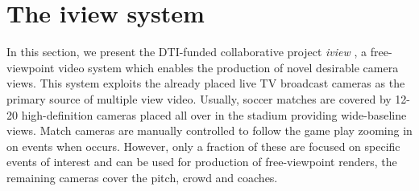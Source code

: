 
\section{The iview system}
In this section, we present the DTI-funded collaborative project \textit{iview} \cite{iview_project},
a free-viewpoint video system which enables the production of novel desirable camera views.
This system exploits the already placed live TV broadcast cameras as the primary
source of multiple view video.
Usually, soccer matches are covered by 12-20 high-definition cameras placed all over in the stadium
providing wide-baseline views.
Match cameras are manually controlled to follow the game play zooming in on events when occurs.
However, only a fraction of these are focused on specific events of interest and can be used for production 
of free-viewpoint renders, the remaining cameras cover the pitch, crowd and coaches.






